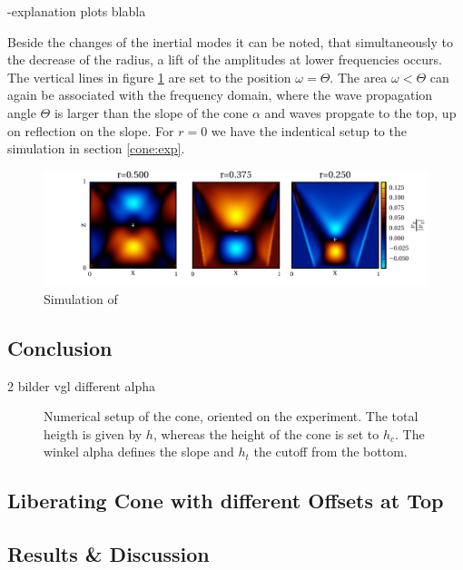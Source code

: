 -explanation plots blabla


Beside the changes of the inertial modes it can be noted, that simultaneously to the decrease of the radius,
a lift of the amplitudes at lower frequencies occurs.
The vertical lines in figure \ref{fig:cone:transition} are set to the position $\omega=\Theta$.
The area $\omega<\Theta$ can again be associated with the frequency domain, where the wave propagation angle $\Theta$ is larger than
the  slope of the cone $\alpha$ and waves propgate to the top, up on reflection on the slope.
For $r=0$ we have the indentical setup to the simulation in section \ref{cone:exp}.

\begin{figure}[!pt]
  \centering
  \includegraphics{gfx/cone/transition/phase.pdf}
  \caption{\label{fig:cone:transition}
    Simulation of
  }
\end{figure}



\clearpage

\subsection{Conclusion}
2 bilder vgl different alpha

\begin{figure}[!bp]
      \centering
      \caption{Numerical setup of the cone, oriented on the experiment. The total heigth
         is given by $h$, whereas the height of the cone is set to $h_c$.
      The winkel alpha defines the slope and $h_t$ the cutoff from the bottom.}
      \label{cone:theorie}
\end{figure}


\clearpage

\subsection{Liberating Cone with different Offsets at Top}
\subsection{Results \& Discussion}

